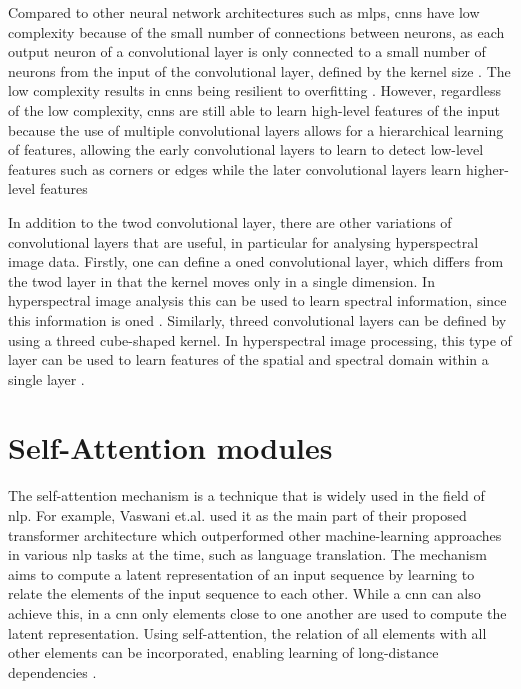 Compared to other neural network architectures such as \acp{mlp}, \acp{cnn} have low complexity because of the small number of connections between neurons, as each output neuron of a convolutional layer is only connected to a small number of neurons from the input of the convolutional layer, defined by the kernel size \citep{gu_recent_2018}. The low complexity results in \acp{cnn} being resilient to overfitting \citep{oshea_introduction_2015,gu_recent_2018}. However, regardless of the low complexity, \acp{cnn} are still able to learn high-level features of the input because the use of multiple convolutional layers allows for a hierarchical learning of features, allowing the early convolutional layers to learn to detect low-level features such as corners or edges while the later convolutional layers learn higher-level features \citep{gu_recent_2018}

In addition to the \ac{twod} convolutional layer, there are other variations of convolutional layers that are useful, in particular for analysing hyperspectral image data. Firstly, one can define a \ac{oned} convolutional layer, which differs from the \ac{twod} layer in that the kernel moves only in a single dimension. In hyperspectral image analysis this can be used to learn spectral information, since this information is \ac{oned} \citep{kuester_1d-convolutional_2021,kuester_transferability_2022}. Similarly, \ac{threed} convolutional layers can be defined by using a \ac{threed} cube-shaped kernel. In hyperspectral image processing, this type of layer can be used to learn features of the spatial and spectral domain within a single layer \citep{guo_learned_2021}.

\section{Self-Attention modules}
The self-attention mechanism is a technique that is widely used in the field of \ac{nlp}. For example, Vaswani et.al. \citep{vaswani_attention_2017} used it as the main part of their proposed transformer architecture which outperformed other machine-learning approaches in various \ac{nlp} tasks at the time, such as language translation. The mechanism aims to compute a latent representation of an input sequence by learning to relate the elements of the input sequence to each other. While a \ac{cnn} can also achieve this, in a \ac{cnn} only elements close to one another are used to compute the latent representation. Using self-attention, the relation of all elements with all other elements can be incorporated, enabling learning of long-distance dependencies \citep{vaswani_attention_2017}.

